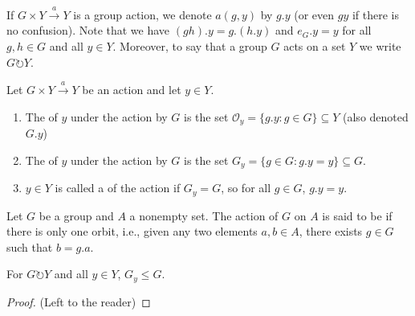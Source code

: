 \begin{note} 
        If $G\times Y\xrightarrow{a}Y$ is a group action, we denote $a(g,y)$ by $g.y$ (or even $gy$ if there is no confusion). Note that we have $(gh).y = g.(h.y)$ and $e_G.y = y$ for all $g,h \in G$ and all $y \in Y$. Moreover, to say that a group $G$ acts on a set $Y$ we write $G \circlearrowright Y$.
\end{note}


\begin{definition}
        Let $G\times Y \xrightarrow{a} Y$ be an action and let $y \in Y$. \begin{enumerate}
                \item The  of $y$ under the action by $G$ is the set $\mathcal{O}_y = \{g.y:g\in G\}\subseteq Y$ (also denoted $G.y$)
                \item The  of $y$ under the action by $G$ is the set $G_y = \{g\in G:g.y = y\}\subseteq G$.
                \item $y \in Y$ is called a  of the action if $G_y = G$, so for all $g \in G$, $g.y = y$.
        \end{enumerate}
\end{definition}

\begin{definition}
    Let $G$ be a group and $A$ a nonempty set. The action of $G$ on $A$ is said to be  if there is only one orbit, i.e., given any two elements $a,b \in A$, there exists $g \in G$ such that $b = g.a$.
\end{definition}



\begin{proposition}
        For $G \circlearrowright Y$ and all $y \in Y$, $G_y \leq G$.
\end{proposition}
\begin{proof}
        (Left to the reader)
\end{proof}


